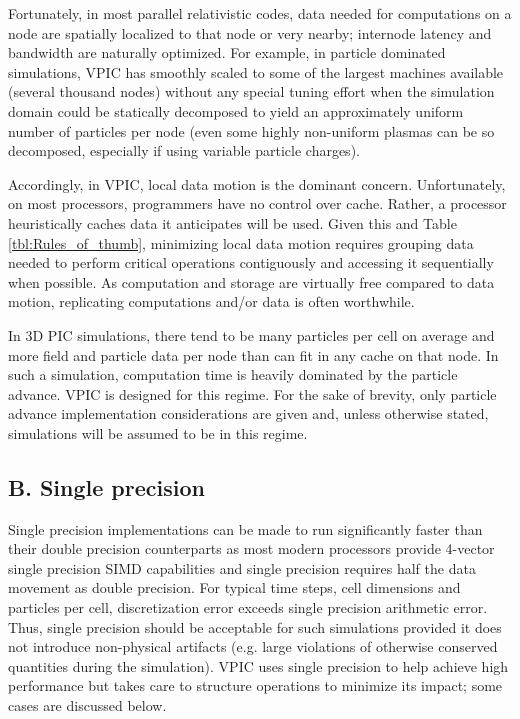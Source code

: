 \documentclass[letter,10pt]{article}
\newcommand{\tbl}[1]{Table \ref{tbl:#1}}
\begin{document}
Fortunately, in most parallel relativistic codes, data needed for
computations on a node are spatially localized to that node or very
nearby; internode latency and bandwidth are naturally optimized.  For
example, in particle dominated simulations, VPIC has smoothly scaled
to some of the largest machines available (several thousand nodes)
without any special tuning effort when the simulation domain could be
statically decomposed to yield an approximately uniform number of
particles per node (even some highly non-uniform plasmas can be so
decomposed, especially if using variable particle charges).

Accordingly, in VPIC, local data motion is the dominant concern.
Unfortunately, on most processors, programmers have no control over
cache.  Rather, a processor heuristically caches data it anticipates
will be used.  Given this and \tbl{Rules_of_thumb}, minimizing local
data motion requires grouping data needed to perform critical
operations contiguously and accessing it sequentially when possible.
As computation and storage are virtually free compared to data motion,
replicating computations and/or data is often worthwhile.

In 3D PIC simulations, there tend to be many particles per cell on
average and more field and particle data per node than can fit in any
cache on that node.  In such a simulation, computation time is heavily
dominated by the particle advance.  VPIC is designed for this regime.
For the sake of brevity, only particle advance implementation
considerations are given and, unless otherwise stated, simulations
will be assumed to be in this regime.

\subsection{B. Single precision}

Single precision implementations can be made to run significantly
faster than their double precision counterparts as most modern
processors provide 4-vector single precision SIMD capabilities and
single precision requires half the data movement as double precision.
For typical time steps, cell dimensions and particles per cell,
discretization error exceeds single precision arithmetic error.  Thus,
single precision should be acceptable for such simulations provided it
does not introduce non-physical artifacts (e.g. large violations of
otherwise conserved quantities during the simulation).  VPIC uses
single precision to help achieve high performance but takes care to
structure operations to minimize its impact; some cases are discussed
below.
\end{document}
